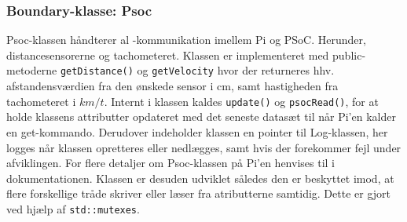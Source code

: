 \subsubsection{Boundary-klasse: Psoc} \label{sec:psoc_klasse}

Psoc-klassen håndterer al \IIC-kommunikation imellem Pi og PSoC. Herunder, distancesensorerne og tachometeret. 
Klassen er implementeret med public-metoderne \texttt{getDistance()} og \texttt{getVelocity} hvor der returneres hhv. afstandensværdien fra den ønskede sensor i cm, samt hastigheden fra tachometeret i $km/t$. 
Internt i klassen kaldes \texttt{update()} og \texttt{psocRead()}, for at holde klassens attributter opdateret med det seneste datasæt til når Pi'en kalder en get-kommando. 
Derudover indeholder klassen en pointer til Log-klassen, her logges når klassen opretteres eller nedlægges, samt hvis der forekommer fejl under afviklingen. For flere detaljer om Psoc-klassen på Pi'en henvises til  i dokumentationen.
Klassen er desuden udviklet således den er beskyttet imod, at flere forskellige tråde skriver eller læser fra atributterne samtidig. Dette er gjort ved hjælp af \texttt{std::mutexes}.